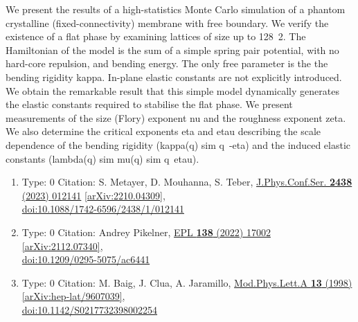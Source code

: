 \documentclass[a4paper,10pt]{article}
\begin{document}
\begin{enumerate}
We present the results of a high-statistics Monte Carlo simulation of a phantom crystalline (fixed-connectivity) membrane with free boundary. We verify the existence of a flat phase by examining lattices of size up to 128~2. The Hamiltonian of the model is the sum of a simple spring pair potential, with no hard-core repulsion, and bending energy. The only free parameter is the the bending rigidity kappa. In-plane elastic constants are not explicitly introduced. We obtain the remarkable result that this simple model dynamically generates the elastic constants required to stabilise the flat phase. We present measurements of the size (Flory) exponent nu and the roughness exponent zeta. We also determine the critical exponents eta and etau describing the scale dependence of the bending rigidity (kappa(q) sim q~{-eta}) and the induced elastic constants (lambda(q) sim mu(q) sim q~{etau}).
\begin{enumerate}
  \item Type: 0 Citation: S. Metayer, D. Mouhanna, S. Teber, \href{https://www.doi.org/10.1088/1742-6596/2438/1/012141}{J.Phys.Conf.Ser. {\bf 2438} (2023) 012141}  \href{https://arxiv.org/abs/2210.04309}{[arXiv:2210.04309]},\\\href{https://www.doi.org/10.1088/1742-6596/2438/1/012141}{doi:10.1088/1742-6596/2438/1/012141}
  \item Type: 0 Citation: Andrey Pikelner, \href{https://www.doi.org/10.1209/0295-5075/ac6441}{EPL {\bf 138} (2022) 17002}  \href{https://arxiv.org/abs/2112.07340}{[arXiv:2112.07340]},\\\href{https://www.doi.org/10.1209/0295-5075/ac6441}{doi:10.1209/0295-5075/ac6441}
  \item Type: 0 Citation: M. Baig, J. Clua, A. Jaramillo, \href{https://www.doi.org/10.1142/S0217732398002254}{Mod.Phys.Lett.A {\bf 13} (1998) }  \href{https://arxiv.org/abs/hep-lat/9607039}{[arXiv:hep-lat/9607039]},\\\href{https://www.doi.org/10.1142/S0217732398002254}{doi:10.1142/S0217732398002254}

\end{enumerate}
\end{enumerate}
\end{document}
